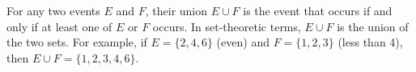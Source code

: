 For any two events $E$ and $F$, their union $E \cup F$ is the event that occurs if and only if at least one of $E$ or $F$ occurs. In set-theoretic terms, $E \cup F$ is the union of the two sets. For example, if $E = \{2,4,6\}$ (even) and $F = \{1,2,3\}$ (less than 4), then $E \cup F = \{1,2,3,4,6\}$.
